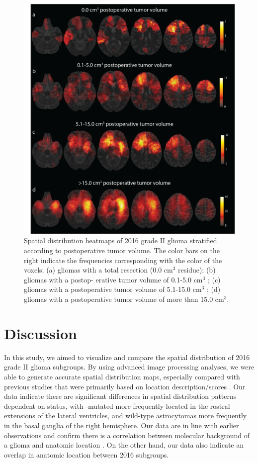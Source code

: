 \begin{figure}
\centering
\includegraphics[width=\textwidth]{Figures/Figure_3.png}
\caption{Spatial distribution heatmaps of  2016 grade II glioma stratified according to postoperative tumor volume. The color bars on the right
indicate the frequencies corresponding with the color of the voxels; (a) gliomas with a total resection (0.0 cm$^3$ residue); (b) gliomas with a postop-
erative tumor volume of 0.1-5.0 cm$^3$ ; (c) gliomas with a postoperative tumor volume of 5.1-15.0 cm$^3$ ; (d) gliomas with a postoperative tumor volume
of more than 15.0 cm$^3$.}
\label{fig:LGG_location_postop_volume}
\end{figure}


\section{Discussion}
In this study, we aimed to visualize and compare the spatial distribution of  2016 grade II glioma subgroups.
By using advanced image processing analyses, we were able to generate accurate spatial distribution maps, especially compared with previous studies that were primarily based on location description/scores \autocite{stockhammer2012idh1, goze2009lack, laigle2004correlations, metellus2010absence}.
Our data indicate there are significant differences in spatial distribution patterns dependent on  status, with -mutated  more frequently located in the rostral extensions of the lateral ventricles, and  wild-type astrocytomas more frequently in the basal ganglia of the right hemisphere.
Our data are in line with earlier observations and confirm there is a correlation between molecular background of a glioma and anatomic location \autocite{stockhammer2012idh1, goze2009lack, laigle2004correlations, metellus2010absence, tejada2018voxel}.
On the other hand, our data also indicate an overlap in anatomic location between  2016 subgroups.

